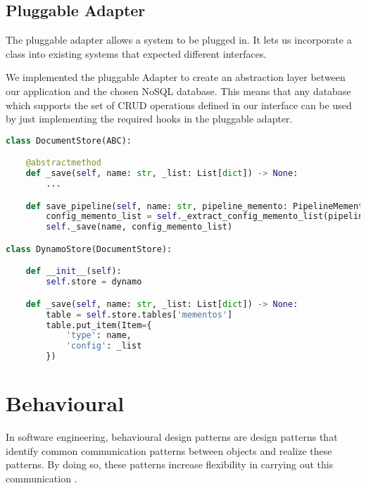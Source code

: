\subsection{Pluggable Adapter}
The pluggable adapter allows a system to be plugged in. It lets us incorporate a class into
existing systems that expected different interfaces.

We implemented the pluggable Adapter to create an abstraction layer between our application and
the chosen NoSQL database. This means that any database which supports the set of CRUD operations
defined in our interface can be used by just implementing the required hooks in the pluggable
adapter.

\begin{lstlisting}[language=Python]
class DocumentStore(ABC):

	@abstractmethod
	def _save(self, name: str, _list: List[dict]) -> None:
		...

	def save_pipeline(self, name: str, pipeline_memento: PipelineMemento) -> None:
		config_memento_list = self._extract_config_memento_list(pipeline_memento)
		self._save(name, config_memento_list)

class DynamoStore(DocumentStore):

	def __init__(self):
		self.store = dynamo

	def _save(self, name: str, _list: List[dict]) -> None:
		table = self.store.tables['mementos']
		table.put_item(Item={
			'type': name,
			'config': _list
		})
\end{lstlisting}

\section{Behavioural}
In software engineering, behavioural design patterns are design patterns that identify common communication patterns
between objects and realize these patterns. By doing so, these patterns increase flexibility in carrying out this
communication \citep{sourcemaking}.


